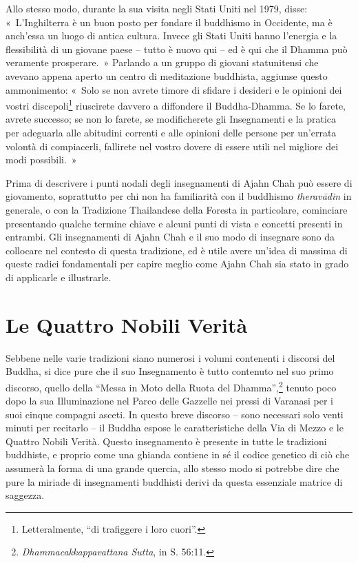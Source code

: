 Allo stesso modo, durante la sua visita negli Stati Uniti nel 1979,
disse: «~L'Inghilterra è un buon posto per fondare il buddhismo in
Occidente, ma è anch'essa un luogo di antica cultura. Invece gli Stati
Uniti hanno l'energia e la flessibilità di un giovane paese -- tutto è
nuovo qui -- ed è qui che il Dhamma può veramente prosperare.~» Parlando
a un gruppo di giovani statunitensi che avevano appena aperto un centro
di meditazione buddhista, aggiunse questo ammonimento: «~Solo se non
avrete timore di sfidare i desideri e le opinioni dei vostri
discepoli\footnote{Letteralmente, ``di trafiggere i loro cuori''.}
riuscirete davvero a diffondere il Buddha-Dhamma. Se lo farete, avrete
successo; se non lo farete, se modificherete gli Insegnamenti e la
pratica per adeguarla alle abitudini correnti e alle opinioni delle
persone per un'errata volontà di compiacerli, fallirete nel vostro
dovere di essere utili nel migliore dei modi possibili.~»

Prima di descrivere i punti nodali degli insegnamenti di Ajahn Chah può
essere di giovamento, soprattutto per chi non ha familiarità con il
\mbox{buddhismo} \emph{theravādin} in generale, o con la Tradizione Thailandese
della Foresta in particolare, cominciare presentando qualche termine
chiave e alcuni punti di vista e concetti presenti in entrambi. Gli
insegnamenti di Ajahn Chah e il suo modo di insegnare sono da collocare
nel contesto di questa tradizione, ed è utile avere un'idea di massima
di queste radici fondamentali per capire meglio come Ajahn Chah sia
stato in grado di applicarle e illustrarle.

\section{Le Quattro Nobili Verità}

Sebbene nelle varie tradizioni siano numerosi i volumi contenenti i
discorsi del Buddha, si dice pure che il suo Insegnamento è tutto
contenuto nel suo primo discorso, quello della ``Messa in Moto della
Ruota del Dhamma'',\footnote{\emph{Dhammacakkappavattana Sutta}, in
  S. 56:11.} tenuto poco dopo la sua Illuminazione
nel Parco delle Gazzelle nei pressi di Varanasi per i suoi cinque
compagni asceti. In questo breve discorso -- sono necessari solo venti
minuti per recitarlo -- il Buddha espose le caratteristiche della Via di
Mezzo e le Quattro Nobili Verità. Questo insegnamento è presente in
tutte le tradizioni buddhiste, e proprio come una ghianda contiene in sé
il codice genetico di ciò che assumerà la forma di una grande quercia,
allo stesso modo si potrebbe dire che pure la miriade di insegnamenti
buddhisti derivi da questa essenziale matrice di saggezza.

